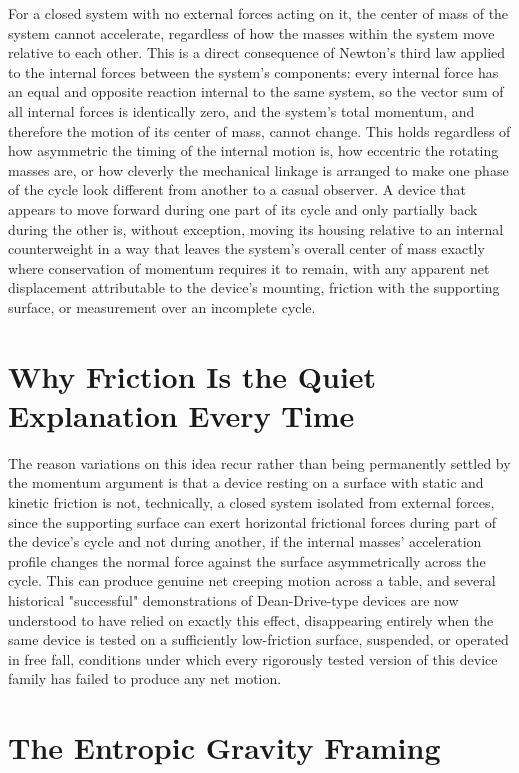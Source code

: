 \documentclass[11pt]{article}
\begin{document}
For a closed system with no external forces acting on it, the center of mass of the system cannot accelerate, regardless of how the masses within the system move relative to each other. This is a direct consequence of Newton's third law applied to the internal forces between the system's components: every internal force has an equal and opposite reaction internal to the same system, so the vector sum of all internal forces is identically zero, and the system's total momentum, and therefore the motion of its center of mass, cannot change. This holds regardless of how asymmetric the timing of the internal motion is, how eccentric the rotating masses are, or how cleverly the mechanical linkage is arranged to make one phase of the cycle look different from another to a casual observer. A device that appears to move forward during one part of its cycle and only partially back during the other is, without exception, moving its housing relative to an internal counterweight in a way that leaves the system's overall center of mass exactly where conservation of momentum requires it to remain, with any apparent net displacement attributable to the device's mounting, friction with the supporting surface, or measurement over an incomplete cycle.

\section{Why Friction Is the Quiet Explanation Every Time}

The reason variations on this idea recur rather than being permanently settled by the momentum argument is that a device resting on a surface with static and kinetic friction is not, technically, a closed system isolated from external forces, since the supporting surface can exert horizontal frictional forces during part of the device's cycle and not during another, if the internal masses' acceleration profile changes the normal force against the surface asymmetrically across the cycle. This can produce genuine net creeping motion across a table, and several historical "successful" demonstrations of Dean-Drive-type devices are now understood to have relied on exactly this effect, disappearing entirely when the same device is tested on a sufficiently low-friction surface, suspended, or operated in free fall, conditions under which every rigorously tested version of this device family has failed to produce any net motion.

\section{The Entropic Gravity Framing}
\end{document}
